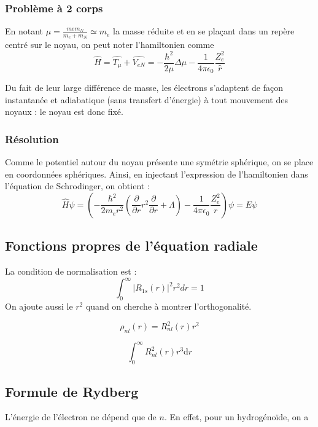 \documentclass[french]{yLectureNote}
\newcommand{\dd}{\mathrm{d}}
\newcommand{\HH}{\hat{H}}
\newcommand{\hb}{\hbar}
\begin{document}
\subsubsection{Problème à 2 corps}
En notant \(\mu = \frac{mem_N}{m_e+m_N} \simeq m_e\) la masse réduite et en se plaçant dans un repère centré sur le noyau, on peut noter l'hamiltonien comme \[\HH = \hat{T_{\mu}} + \hat{V_{eN}} = -\frac{\hb^2}{2\mu}\Delta \mu - \frac{1}{4\pi \epsilon_0}\frac{Z_e^2}{\hat{r}}\]
\begin{theorem}
Du fait de leur large différence de masse, les électrons s'adaptent de façon instantanée et adiabatique (sans transfert d'énergie) à tout mouvement des noyaux : le noyau est donc fixé.
\end{theorem}
\subsubsection{Résolution}
Comme le potentiel autour du noyau présente une symétrie sphérique, on se place en coordonnées sphériques. Ainsi, en injectant l'expression de l'hamiltonien dans l'équation de Schrodinger, on obtient :
\[\HH \psi = (-\frac{\hb^2}{2m_er^2}(\frac{\partial}{\partial r}r^2\frac{\partial}{\partial r}+\Lambda)-\frac{1}{4\pi \epsilon_0}\frac{Z_e^2}{r})\psi = E\psi\]
\subsection{Fonctions propres de l'équation radiale}
\begin{theorem}
La condition de normalisation est :
\[ \int_0^\infty |R_{1s}(r)|^2 r^2 dr = 1 \] On ajoute aussi le \(r^2\) quand on cherche à montrer l'orthogonalité.
\end{theorem}
\begin{theorem}
\[\rho_{nl}(r) = R^2_{nl}(r)r^2\]
\end{theorem}
\begin{theorem}
\[\int_0^\infty R^2_{nl}(r)r^3 \dd r\]
\end{theorem}
\subsection{Formule de Rydberg}
L'énergie de l’électron ne dépend que de \(n\). En effet, pour un hydrogénoïde, on a
\end{document}

